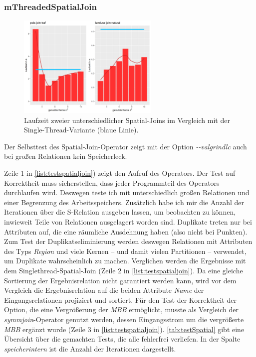 \documentclass[a4paper,12pt,twoside]{article}
\newcommand{\Fb}[1]{\textit{#1}} %
\begin{document}
\subsubsection{mThreadedSpatialJoin}

\begin{figure}
	\centering
	\includegraphics[width=0.60\textwidth]{Bilder/sj_kerne.png}
	\caption{Laufzeit zweier unterschiedlicher Spatial-Joins im Vergleich mit der Single-Thread-Variante (blaue Linie).}
	\label{img:sjKern}
\end{figure}

Der Selbsttest des Spatial-Join-Operator zeigt mit der Option \Fb{-{}-valgrindlc} auch bei großen Relationen kein Speicherleck.

Zeile 1 in \autoref{list:testspatialjoin}) zeigt den Aufruf des Operators. Der Test auf Korrektheit muss sicherstellen, dass jeder Programmteil des Operators durchlaufen wird. Deswegen teste ich mit unterschiedlich großen Relationen und einer Begrenzung des Arbeitsspeichers. Zusätzlich habe ich mir die Anzahl der Iterationen über die S-Relation ausgeben lassen, um beobachten zu können, inwieweit Teile von Relationen ausgelagert worden sind. Duplikate treten nur bei Attributen auf, die eine räumliche Ausdehnung haben (also nicht bei Punkten). Zum Test der Duplikatseliminierung werden deswegen Relationen mit Attributen des Typs \Fb{Region} und viele Kernen -- und damit vielen Partitionen -- verwendet, um Duplikate wahrscheinlich zu machen. Verglichen werden die Ergebnisse mit dem Singlethread-Spatial-Join (Zeile 2 in \autoref{list:testspatialjoin}). Da eine gleiche Sortierung der Ergebnisrelation nicht garantiert werden kann, wird vor dem Vergleich die Ergebnisrelation auf die beiden Attribute \Fb{Name} der Eingangsrelationen projiziert und sortiert. Für den Test der Korrektheit der Option, die eine Vergrößerung der \Fb{MBB} ermöglicht, musste als Vergleich der \Fb{symmjoin}-Operator genutzt werden, dessen Eingangsstrom um die vergrößerte \Fb{MBB} ergänzt wurde (Zeile 3 in \autoref{list:testspatialjoin}). \autoref{tab:testSpatial} gibt eine Übersicht über die gemachten Tests, die alle fehlerfrei verliefen. In der Spalte \Fb{speicherintern} ist die Anzahl der Iterationen dargestellt. 
\end{document}
